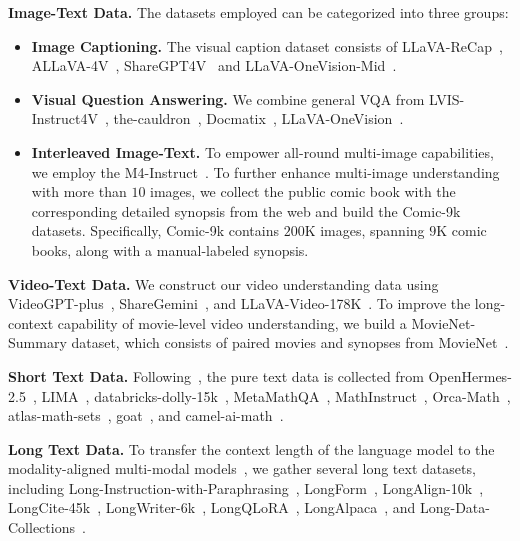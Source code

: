 \textbf{Image-Text Data.}
%
The datasets employed can be categorized into three groups:
%
\begin{itemize}[leftmargin=2.0em]
    \item
    \textbf{Image Captioning.}
    The visual caption dataset consists of LLaVA-ReCap~\cite{li2024llavanext-ablations}, ALLaVA-4V~\cite{ALLaVA-4V}, ShareGPT4V~\cite{ShareGPT4V} and LLaVA-OneVision-Mid~\cite{LLaVA-OneVision}.

    \item
    \textbf{Visual Question Answering.}
    We combine general VQA from LVIS-Instruct4V~\cite{LVIS-Instruct4V}, the-cauldron~\cite{Idefics2}, Docmatix~\cite{Idefics3}, LLaVA-OneVision~\cite{LLaVA-OneVision}.

    \item
    \textbf{Interleaved Image-Text.}
    To empower all-round multi-image capabilities, we employ the M4-Instruct~\cite{li2024llavanext-interleave}.
    To further enhance multi-image understanding with more than $10$ images, we collect the public comic book with the corresponding detailed synopsis from the web and build the Comic-9k datasets.
    Specifically, Comic-9k contains $200$K images, spanning $9$K comic books, along with a manual-labeled synopsis.
\end{itemize}





\textbf{Video-Text Data.}
%
We construct our video understanding data using VideoGPT-plus~\cite{VideoGPT-plus}, ShareGemini~\cite{ShareGemini}, and LLaVA-Video-178K~\cite{LLaVA-Video}.
%
To improve the long-context capability of movie-level video understanding, we build a MovieNet-Summary dataset, which consists of paired movies and synopses from MovieNet~\cite{MovieNet}.
%


%
\textbf{Short Text Data.}
Following~\cite{Idefics3}, the pure text data is collected from OpenHermes-2.5~\cite{OpenHermes-2.5}, LIMA~\cite{LIMA}, databricks-dolly-15k~\cite{databricks-dolly-15k}, MetaMathQA~\cite{MetaMathQA}, MathInstruct~\cite{MathInstruct}, Orca-Math~\cite{Orca-Math}, atlas-math-sets~\cite{atlas-math-sets}, goat~\cite{goat}, and camel-ai-math~\cite{CAMEL}.
%


%
\textbf{Long Text Data.}
To transfer the context length of the language model to the modality-aligned multi-modal models~\cite{LongVA}, we gather several long text datasets, including Long-Instruction-with-Paraphrasing~\cite{Long-Instruction-with-Paraphrasing}, LongForm~\cite{LongForm}, LongAlign-10k~\cite{LongAlign}, LongCite-45k~\cite{LongCite}, LongWriter-6k~\cite{LongWriter}, LongQLoRA~\cite{LongQLoRA}, LongAlpaca~\cite{LongLoRA}, and Long-Data-Collections~\cite{Long-Data-Collections}.
%


